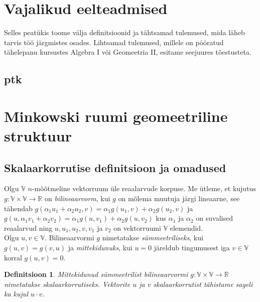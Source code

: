 \documentclass[a4paper,12pt]{article}
\newtheorem{definitsioon}{Definitsioon}[section]
\numberwithin{equation}{section}
\begin{document}
\section{Vajalikud eelteadmised}

Selles peatükis toome välja definitsioonid ja tähtsamad tulemused, mida läheb tarvis töö järgmistes osades. Lihtsamad tulemused, millele on pööratud tähelepanu kursustes Algebra I või Geomeetria II, esitame seejuures tõestusteta.

\subsection{ptk}

\newpage

\section{Minkowski ruumi geomeetriline struktuur}

\subsection{Skalaarkorrutise definitsioon ja omadused}

Olgu $\mathbb{V}$ $n$-mõõtmeline vektorruum üle reaalarvude korpuse. Me ütleme, et kujutus $g : \mathbb{V} \times \mathbb{V} \rightarrow \mathbb{R}$ on \emph{bilineaarvorm}, kui $g$ on mõlema muutuja järgi lineaarne, see tähendab $g \left( \alpha_1 u_1 + \alpha_2 u_2, v \right) = \alpha_1 g \left( u_1, v \right) + \alpha_2 g \left( u_2, v \right)$ ja $g \left( u, \alpha_1 v_1 + \alpha_2 v_2 \right) = \alpha_1 g \left( u, v_1 \right) + \alpha_2 g \left( u, v_2 \right)$ kus $\alpha_1$ ja $\alpha_2$ on suvalised reaalarvud ning $u, u_1, u_2, v, v_1$ ja $v_2$ on vektorruumi $\mathbb{V}$ elemendid. 
\\
Olgu $u, v \in \mathbb{V}$. Bilineaarvormi $g$ nimetatakse \emph{sümmeetriliseks}, kui $g \left( u, v \right) = g \left(v, u \right)$ ja \emph{mittekidunuks}, kui $u = 0$ järeldub tingumusest iga $v \in \mathbb{V}$ korral $g \left( u, v \right) = 0$.

\begin{definitsioon}
Mittekidunud sümmeetrilist bilineaarvormi $g: \mathbb{V} \times \mathbb{V} \rightarrow \mathbb{R}$ nimetatakse \emph{skalaarkorrutiseks}. Vektorite $u$ ja $v$ skalaarkorrutist tähistame sageli ka kujul $u \cdot v$.
\end{definitsioon}
\end{document}

